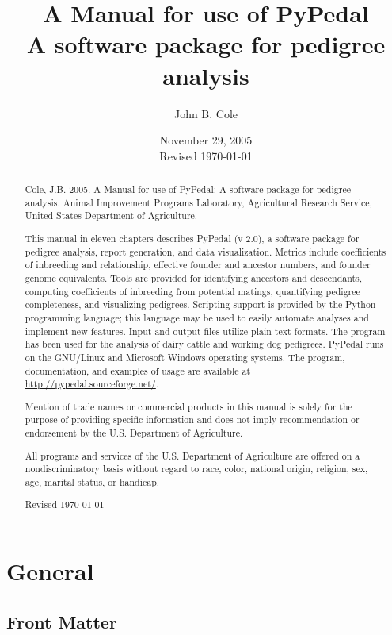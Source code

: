 \documentclass[letterpaper,hyperref,titlepage]{manual}
\title{A Manual for use of PyPedal\\A software package for pedigree analysis}
\author{John B. Cole}
\date{November 29, 2005 \\ Revised \today}                   %
\begin{document}
\maketitle

\begin{abstract}
Cole, J.B.  2005.  A Manual for use of PyPedal: A software package for pedigree analysis.  Animal Improvement Programs Laboratory, Agricultural Research Service, United States Department of Agriculture.

This manual in eleven chapters describes PyPedal (v 2.0), a software package for pedigree analysis, report generation, and
data visualization.  Metrics include coefficients of inbreeding and relationship, effective founder and ancestor numbers, and
founder genome equivalents.  Tools are provided for identifying ancestors and descendants, computing coefficients of
inbreeding from potential matings, quantifying pedigree completeness, and visualizing pedigrees.  Scripting support is
provided by the Python programming language; this language may be used to easily automate analyses and implement new features.
Input and output files utilize plain-text formats.  The program has been used for the analysis of dairy cattle and working dog
pedigrees.  PyPedal runs on the GNU/Linux and Microsoft Windows operating systems.  The program, documentation, and examples
of usage are available at \url{http://pypedal.sourceforge.net/}.

Mention of trade names or commercial products in this manual is solely for the purpose of providing specific information and
does not imply recommendation or endorsement by the U.S. Department of Agriculture.

All programs and services of the U.S. Department of Agriculture are offered on a nondiscriminatory basis without regard to
race, color, national origin, religion, sex, age, marital status, or handicap.

Revised \today
\end{abstract}

\ifhtml
\part*{General}
\chapter*{Front Matter}
\label{front}
\fi



\tableofcontents
\listoftables
\listoffigures











%





\printindex
\printindex[func]
\end{document}
